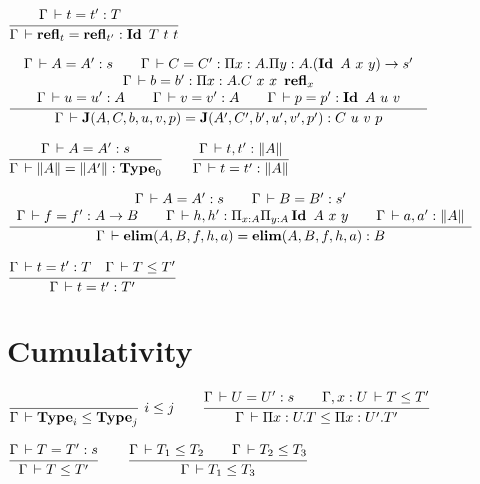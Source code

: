 \documentclass[a4paper,english]{lipics-utf8x}
\begin{document}
  \begin{center}
  \(
    \ru{\Gamma \der t = t' : T \qquad
      }{\Gamma \der \refl_t = \refl_{t'} : \Id T\ t\ t}
  \)
  \end{center}

  \begin{center}
  \(
    \tru{\Gamma \der A = A' : s \qquad
         \Gamma \der C = C' : \Pi x:A. \Pi y:A. (\Id A\ x\ y) \to s'
       }{\Gamma \der b = b' : \Pi x:A. C\ x\ x\ \refl_x
       }{\Gamma \der u = u' : A \qquad
         \Gamma \der v = v' : A \qquad
         \Gamma \der p = p' : \Id A\ u\ v
       }{\Gamma \der \J (A,C,b,u,v,p) = \J (A',C',b',u',v',p') : C\ u\ v\ p}
  \)
  \end{center}

  \begin{center}
  \(
    \ru{\Gamma \der A = A' : s
      }{\Gamma \der \squash{A} = \squash{A'} : \Type_0}
    \qquad
    \ru{\Gamma \der t, t' : \squash{A}
      }{\Gamma \der t = t' : \squash{A}}
  \)
  \end{center}

  \begin{center}
  \(
    \dru{\Gamma \der A = A' : s \qquad
         \Gamma \der B = B' : s'
       }{\Gamma \der f = f' : A \to B \qquad
         \Gamma \der h, h' : \Pi_{x:A} \Pi_{y:A} \Id A\ x\ y \qquad
         \Gamma \der a, a' : \squash{A}
       }{\Gamma \der \elim(A,B,f,h,a) = \elim(A,B,f,h,a) : B}
  \)
  \end{center}


  \begin{center}
  \(
    \ru{\Gamma \der t = t' : T \quad
        \Gamma \der T \le T'
      }{\Gamma \der t = t' : T'}
  \)
  \end{center}

  \section{Cumulativity}

  \begin{center}
  \(
    \rux{}{\Gamma \der \Type_i \le \Type_j}{i \le j}
    \qquad
    \ru{\Gamma \der U = U' : s \qquad
        \Gamma, x:U \der T \le T'
      }{\Gamma \der \Pi x:U.T \le \Pi x:U'.T'}
  \)
  \end{center}

  \begin{center}
  \(
    \ru{\Gamma \der T = T' : s
      }{\Gamma \der T \le T'}
    \qquad
    \ru{\Gamma \der T_1 \le T_2 \qquad
        \Gamma \der T_2 \le T_3
      }{\Gamma \der T_1 \le T_3}
  \)
  \end{center}
\end{document}
